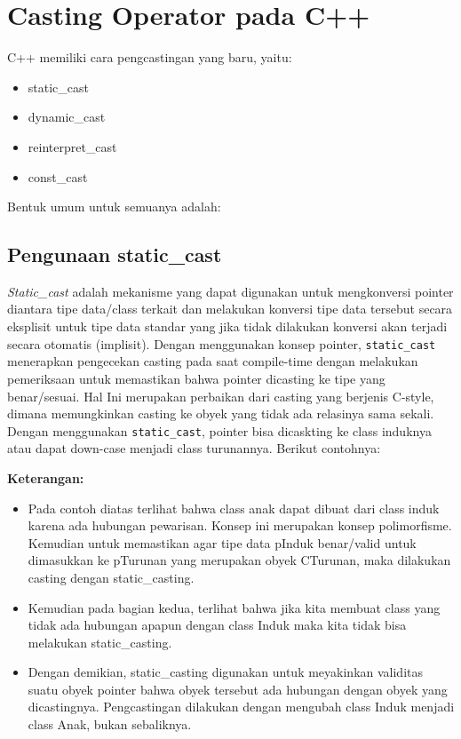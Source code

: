 \section{Casting Operator pada C++}\label{casting-operator-pada-c}

C++ memiliki cara pengcastingan yang baru, yaitu:

\begin{itemize}

\item
static\_cast
\item
dynamic\_cast
\item
reinterpret\_cast
\item
const\_cast
\end{itemize}

Bentuk umum untuk semuanya adalah:



\subsection{Pengunaan static\_cast}\label{pengunaan-staticux5fcast}

\emph{Static\_cast} adalah mekanisme yang dapat digunakan untuk
mengkonversi pointer diantara tipe data/class terkait dan melakukan
konversi tipe data tersebut secara eksplisit untuk tipe data standar
yang jika tidak dilakukan konversi akan terjadi secara otomatis
(implisit). Dengan menggunakan konsep pointer, \texttt{static\_cast}
menerapkan pengecekan casting pada saat compile-time dengan melakukan
pemeriksaan untuk memastikan bahwa pointer dicasting ke tipe yang
benar/sesuai. Hal Ini merupakan perbaikan dari casting yang berjenis
C-style, dimana memungkinkan casting ke obyek yang tidak ada relasinya
sama sekali. Dengan menggunakan \texttt{static\_cast}, pointer bisa
dicaskting ke class induknya atau dapat down-case menjadi class
turunannya. Berikut contohnya:



\textbf{Keterangan:}

\begin{itemize}

\item
Pada contoh diatas terlihat bahwa class anak dapat dibuat dari class
induk karena ada hubungan pewarisan. Konsep ini merupakan konsep
polimorfisme. Kemudian untuk memastikan agar tipe data pInduk
benar/valid untuk dimasukkan ke pTurunan yang merupakan obyek
CTurunan, maka dilakukan casting dengan static\_casting.
\item
Kemudian pada bagian kedua, terlihat bahwa jika kita membuat class
yang tidak ada hubungan apapun dengan class Induk maka kita tidak bisa
melakukan static\_casting.
\item
Dengan demikian, static\_casting digunakan untuk meyakinkan validitas
suatu obyek pointer bahwa obyek tersebut ada hubungan dengan obyek
yang dicastingnya. Pengcastingan dilakukan dengan mengubah class Induk
menjadi class Anak, bukan sebaliknya.
\end{itemize}

